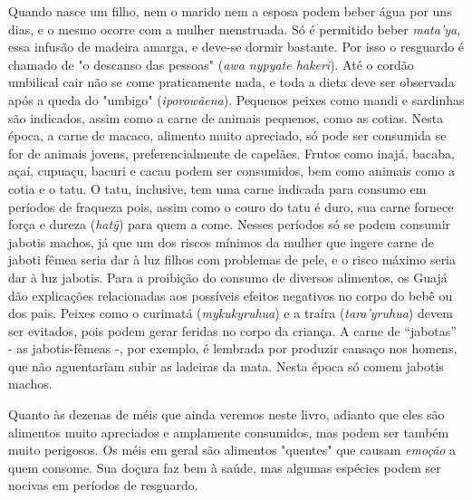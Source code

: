 Quando nasce um filho, nem o marido nem a esposa podem beber água por
uns dias, e o mesmo ocorre com a mulher menstruada. Só é permitido beber
\emph{mata'ya}, essa infusão de madeira amarga, e deve-se dormir
bastante. Por isso o resguardo é chamado de "o descanso das pessoas"
(\emph{awa nypyate hakeri}). Até o cordão umbilical cair não se come
praticamente nada, e toda a dieta deve ser observada após a queda do
"umbigo" (\emph{iporowãena}). Pequenos peixes como mandi e sardinhas são
indicados, assim como a carne de animais pequenos, como as cotias. Nesta
época, a carne de macaco, alimento muito apreciado, só pode ser
consumida se for de animais jovens, preferencialmente de capelães.
Frutos como inajá, bacaba, açaí, cupuaçu, bacuri e cacau podem ser
consumidos, bem como animais como a cotia e o tatu. O tatu, inclusive,
tem uma carne indicada para consumo em períodos de fraqueza pois, assim
como o couro do tatu é duro, sua carne fornece força e dureza
(\emph{hatỹ}) para quem a come. Nesses períodos só se podem consumir
jabotis machos, já que um dos riscos mínimos da mulher que ingere carne
de jaboti fêmea seria dar à luz filhos com problemas de pele, e o risco
máximo seria dar à luz jabotis. Para a proibição do consumo de diversos
alimentos, os Guajá dão explicações relacionadas aos possíveis efeitos
negativos no corpo do bebê ou dos pais. Peixes como o curimatá
(\emph{mykukyruhua}) e a traíra (\emph{tara'yruhua}) devem ser evitados,
pois podem gerar feridas no corpo da criança. A carne de ``jabotas'' -
as jabotis-fêmeas -, por exemplo, é lembrada por produzir cansaço nos
homens, que não aguentariam subir as ladeiras da mata. Nesta época só
comem jabotis machos.

Quanto às dezenas de méis que ainda veremos neste livro, adianto que
eles são alimentos muito apreciados e amplamente consumidos, mas podem
ser também muito perigosos. Os méis em geral são alimentos "quentes" que
causam \emph{emoção} a quem consome. Sua doçura faz bem à saúde, mas
algumas espécies podem ser nocivas em períodos de resguardo.



